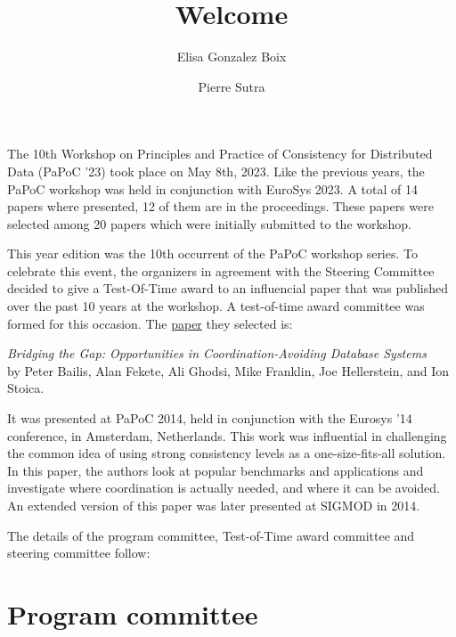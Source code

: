\documentclass[acmsmall,nonacm]{acmart}
\newenvironment{RCText}[1][2em]
               {\begin{quoting}[leftmargin=#1,rightmargin=#1]\RaggedRight}
               {\end{quoting}}
\begin{document}
\title{Welcome}
\author{Elisa Gonzalez Boix}
\author{Pierre Sutra}
\authorsaddresses{}
\renewcommand{\shortauthors}{}
\maketitle

The 10th Workshop on Principles and Practice of Consistency for Distributed Data (PaPoC '23) took place on May 8th, 2023.
Like the previous years, the PaPoC workshop was held in conjunction with EuroSys 2023.
A total of 14 papers where presented, 12 of them are in the proceedings.
These papers were selected among 20 papers which were initially submitted to the workshop.

This year edition was the 10th occurrent of the PaPoC workshop series.
To celebrate this event, the organizers in agreement with the Steering Committee decided to give a Test-Of-Time award to an influencial paper that was published over the past 10 years at the workshop.
A test-of-time award committee was formed for this occasion.
The \href{http://www.bailis.org/blog/bridging-the-gap-opportunities-in-coordination-avoiding-databases/}{paper} they selected is:

\medskip

\begin{RCText}[.5cm]
  \textit{Bridging the Gap: Opportunities in Coordination-Avoiding Database Systems} \\
  by Peter Bailis, Alan Fekete, Ali Ghodsi, Mike Franklin, Joe Hellerstein, and Ion Stoica.
\end{RCText}

\medskip

It was presented at PaPoC 2014, held in conjunction with the Eurosys '14 conference, in Amsterdam, Netherlands.
This work was influential in challenging the common idea of using strong consistency levels as a one-size-fits-all solution.
In this paper, the authors look at popular benchmarks and applications and investigate where coordination is actually needed, and where it can be avoided.
An extended version of this paper was later presented at SIGMOD in 2014.

The details of the program committee, Test-of-Time award committee and steering committee follow:

\section*{Program committee}
\end{document}
